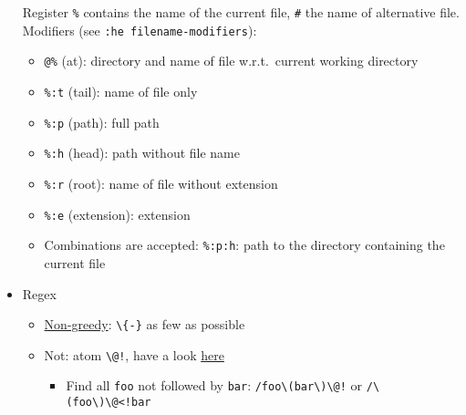 \documentclass[a4paper,12pt,%
              final%
              ]{article}
\begin{document}
\begin{itemize}
    Register \verb|%| contains the name of the current file, \verb|#| the name of alternative file.
    Modifiers (see \verb|:he filename-modifiers|):
    \begin{itemize}
      \item \verb|@%| (at): directory and name of file w.r.t.~current working directory
      \item \verb|%:t| (tail): name of file only
      \item \verb|%:p| (path): full path
      \item \verb|%:h| (head): path without file name
      \item \verb|%:r| (root): name of file without extension
      \item \verb|%:e| (extension): extension
      \item Combinations are accepted: \verb|%:p:h|: path to the directory containing the current file
    \end{itemize}
  \item Regex
    \begin{itemize}
      \item \href{http://vimregex.com/#Non-Greedy}{Non-greedy}: \verb|\{-}| as few as possible
      \item Not: atom \verb|\@!|, have a look \href{https://vim.fandom.com/wiki/Search_for_lines_not_containing_pattern_and_other_helpful_searches}{here}
        \begin{itemize}
          \item Find all \texttt{foo} not followed by \texttt{bar}: \verb|/foo\(bar\)\@!| or \verb|/\(foo\)\@<!bar|
        \end{itemize}
    \end{itemize}
\end{itemize}
%
\end{document}

